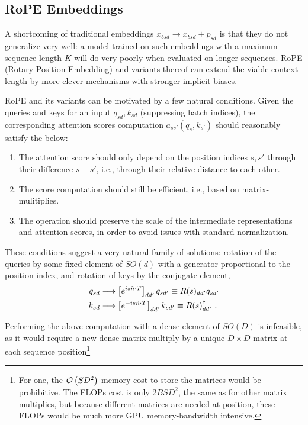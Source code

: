 \documentclass[11pt]{article}
\begin{document}
\subsection{RoPE Embeddings}

A shortcoming of traditional embeddings $ x _{ bsd } \longrightarrow x _{ bsd } + p _{ sd } $ is
that they do not generalize very well: a model trained on such embeddings with a maximum sequence
length $ K $ will do very poorly when evaluated on longer sequences. RoPE (Rotary Position
Embedding) \cite{su2022roformer} and variants thereof can extend the viable context length by more clever mechanisms with
stronger implicit biases.

RoPE and its variants can be motivated by a few natural conditions.  Given the queries and keys for
an input $ q _{ sd }, k _{ sd } $ (suppressing batch indices), the corresponding attention scores computation $ a _{ ss' }\left ( q _{ s },
	k _{ s' } \right ) $ should reasonably satisfy the below:
\begin{enumerate}
	\item The attention score should only depend on the position indices $ s, s' $ through their difference
	      $ s-s' $, i.e., through their relative distance to each other.
	\item The score computation should still be efficient, i.e., based on matrix-mulitiplies.
	\item The operation should preserve the scale of the intermediate representations and attention
	      scores, in order to avoid issues with standard normalization.
\end{enumerate}
These conditions suggest a very natural family of solutions: rotation of the queries by some fixed
element of $ SO(d) $ with a generator proportional to the position index, and rotation of keys by
the conjugate element,
\begin{align}
	q _{ sd } & \longrightarrow \left [e^{ i s \hat{n}\cdot T }\right ]_{ d d' } q _{ sd' } \equiv R(s) _{ d d' } q _{ sd' } \nonumber\\
	k _{ sd } & \longrightarrow \left [e^{ -i s \hat{n}\cdot T }\right ]_{ d d' } k _{ sd' } \equiv  R(s)^{ \dagger } _{ d d' } \ . \label{eq_rope}
\end{align}

Performing the above computation with a dense element of $ SO(D) $ is infeasible, as it would require
a new dense matrix-multiply by a unique $ D \times D $ matrix at each sequence
position\footnote{For one, the $ \mathcal{O} \left( SD ^{ 2 } \right)  $ memory cost to store the matrices
    would be prohibitive. The FLOPs cost is only $ 2BSD ^{ 2 } $, the same as for other matrix
    multiplies, but because different matrices are needed at position, these FLOPs would be much more
    GPU memory-bandwidth intensive.
}
\end{document}
